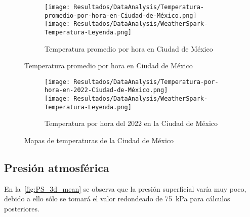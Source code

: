 			\begin{figure}[H]
				\centering
				\begin{subfigure}[t]{\linewidth}
					\centering
					\texttt{[image: Resultados/DataAnalysis/Temperatura-promedio-por-hora-en-Ciudad-de-México.png]}
					\\\texttt{[image: Resultados/DataAnalysis/WeatherSpark-Temperatura-Leyenda.png]}
					\caption{Temperatura promedio por hora en Ciudad de México}
					\label{fig:Temperatura-promedio-por-hora-en-Ciudad-de-México}
				\end{subfigure}
			\end{figure}
			\begin{figure}[H]\ContinuedFloat
				\begin{subfigure}[t]{\linewidth}
					\centering
					\texttt{[image: Resultados/DataAnalysis/Temperatura-por-hora-en-2022-Ciudad-de-México.png]}\\
					\texttt{[image: Resultados/DataAnalysis/WeatherSpark-Temperatura-Leyenda.png]}
					\caption{Temperatura por hora del 2022 en la Ciudad de México}
					\label{fig:Temperatura-por-hora-en-2022-Ciudad-de-México}
				\end{subfigure}
				\caption{Mapas de temperaturas de la Ciudad de México}
				\label{fig:Temperatura-CDMX}
			\end{figure}
		
		\subsection{Presión atmosférica}
			
			En la~\cref{fig:PS_3d_mean} se observa que la presión superficial varía muy poco, debido a ello sólo se tomará el valor redondeado de \qty{75}{\kilo\pascal} para cálculos posteriores.
			
